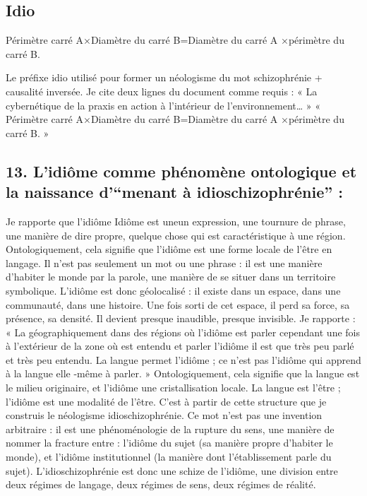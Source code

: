 \documentclass[12pt,letterpaper,oneside]{article}
\begin{document}
\subsection*{Idio}
Périmètre carré A×Diamètre du carré B=Diamètre du carré A ×périmètre du carré B.

 Le préfixe idio utilisé pour former un néologisme du mot schizophrénie + causalité inversée.
Je cite deux lignes du document comme requis : « La cybernétique de la praxis en action à l’intérieur de l’environnement… » « Périmètre carré A×Diamètre du carré B=Diamètre du carré A ×périmètre du carré B. »

\subsection*{13. L’idiôme comme phénomène ontologique et la naissance d’\hspace{0pt}“menant à idioschizophrénie” :}
Je rapporte que l’idiôme
Idiôme est uneun expression, une tournure de phrase, une manière de dire propre, quelque chose qui est caractéristique à une région. Ontologiquement, cela signifie que l’idiôme est une forme locale de l’être en langage. Il n’est pas seulement un mot ou une phrase : il est une manière d’habiter le monde par la parole, une manière de se situer dans un territoire symbolique.
L’idiôme est donc géolocalisé : il existe dans un espace, dans une communauté, dans une histoire. Une fois sorti de cet espace, il perd sa force, sa présence, sa densité. Il devient presque inaudible, presque invisible.
Je rapporte :
« La géographiquement dans des régions où l’idiôme est parler cependant une fois à l’extérieur de la zone où est entendu et parler l’idiôme il est que très peu parlé et très peu entendu. La langue permet l’idiôme ; ce n’est pas l’idiôme qui apprend à la langue elle -même à parler. »
Ontologiquement, cela signifie que la langue est le milieu originaire, et l’idiôme une cristallisation locale. La langue est l’être ; l’idiôme est une modalité de l’être.
C’est à partir de cette structure que je construis le néologisme idioschizophrénie. Ce mot n’est pas une invention arbitraire : il est une phénoménologie de la rupture du sens, une manière de nommer la fracture entre :
	l’idiôme du sujet (sa manière propre d’habiter le monde),
	et l’idiôme institutionnel (la manière dont l’établissement parle du sujet).
L’idioschizophrénie est donc une schize de l’idiôme, une division entre deux régimes de langage, deux régimes de sens, deux régimes de réalité.
\end{document}
